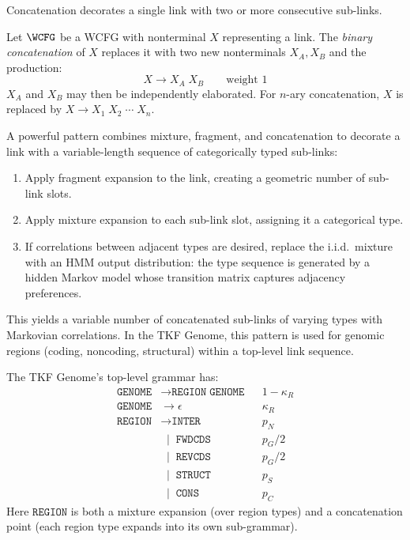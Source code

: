 Concatenation decorates a single link with two or more consecutive
sub-links.

\begin{definition}
\label{def:concat-appendix}
Let $\WCFG$ be a WCFG with nonterminal $X$ representing a link.
The \emph{binary concatenation} of $X$ replaces it with
two new nonterminals $X_A, X_B$ and the production:
\begin{equation}
X \to X_A\;X_B \qquad \text{weight } 1
\end{equation}
$X_A$ and $X_B$ may then be independently elaborated.
For $n$-ary concatenation, $X$ is replaced by
$X \to X_1\;X_2\;\cdots\;X_n$.
\end{definition}

\begin{remark}
A powerful pattern combines mixture, fragment, and concatenation
to decorate a link with a variable-length sequence of
categorically typed sub-links:
\begin{enumerate}
\item Apply fragment expansion to the link, creating a geometric
  number of sub-link slots.
\item Apply mixture expansion to each sub-link slot, assigning it
  a categorical type.
\item If correlations between adjacent types are desired,
  replace the i.i.d.\ mixture with an HMM output distribution:
  the type sequence is generated by a hidden Markov model
  whose transition matrix captures adjacency preferences.
\end{enumerate}
This yields a variable number of concatenated sub-links
of varying types with Markovian correlations.
In the TKF Genome, this pattern is used for genomic regions
(coding, noncoding, structural) within a top-level link sequence.
\end{remark}

\begin{example}
The TKF Genome's top-level grammar has:
\begin{align*}
\texttt{GENOME} &\to \texttt{REGION}\;\texttt{GENOME} && 1-\kappa_R \\
\texttt{GENOME} &\to \epsilon && \kappa_R \\
\texttt{REGION} &\to \texttt{INTER} && p_N \\
                &\;\;|\;\; \texttt{FWDCDS} && p_G/2 \\
                &\;\;|\;\; \texttt{REVCDS} && p_G/2 \\
                &\;\;|\;\; \texttt{STRUCT} && p_S \\
                &\;\;|\;\; \texttt{CONS} && p_C
\end{align*}
Here $\texttt{REGION}$ is both a mixture expansion (over region types)
and a concatenation point (each region type expands into its own sub-grammar).
\end{example}

